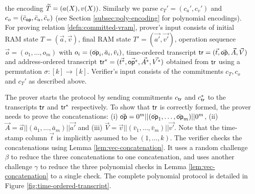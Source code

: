 the encoding $\widetilde{T}=(a(X), v(X))$. Similarly we parse $c_T'=(c_a', c_v')$ and $c_o=(\bar{c}_{\mathsf{op}}, \bar{c}_a, \bar{c}_v)$ (see Section
\ref{subsec:poly-encoding} for polynomial encodings).
For proving relation \ref{defn:committed-vram}, prover's input consists of initial RAM state $T=(\vec{a},\vec{v})$,
final RAM state $T'=(\vec{a'},\vec{v'})$, operation sequence $\vec{o}=(o_1,\ldots,o_m)$ with $o_i=(\bar{\mathsf{op}}_i,\bar{a}_i,\bar{v}_i)$,
time-ordered transcript $\mathsf{tr}=(\vec{t},\vec{\mathsf{op}},\vec{A},\vec{V})$ and address-ordered transcript $\mathsf{tr}^\ast=(\vec{t^\ast},\vec{\mathsf{op}^\ast},
\vec{A^\ast},\vec{V^\ast})$ obtained from $\mathsf{tr}$ using a permutation $\sigma:[k]\rightarrow [k]$. Verifier's input consists of the
commitments $c_T, c_o$ and $c_T'$ as described above.

The prover starts the protocol by sending commitments $c_{\mathsf{tr}}$ and $c^\ast_{\mathsf{tr}}$ to the transcripts $\mathsf{tr}$ and $\mathsf{tr}^\ast$ respectively.
To show that $\mathsf{tr}$ is correctly formed, the prover needs to prove the concatenations:
(i) $\vec{\mathsf{op}}=0^m||(\bar{\mathsf{op}}_1,\ldots,\bar{\mathsf{op}}_m)||0^m$, (ii) $\vec{A}=\vec{a}||(\bar{a}_1,\ldots,\bar{a}_m)||\vec{a'}$
and (iii) $\vec{V}=\vec{v}||(\bar{v}_1,\ldots,\bar{v}_m)||\vec{v'}$. Note that the time-stamp column $\vec{t}$ is implicitly assumed
to be $(1,\ldots,k)$.
The verifier checks the concatenations using Lemma \ref{lem:vec-concatenation}.
It uses a random challenge $\beta$ to reduce the three concatenations to one concatenation, and uses another challenge $\gamma$
to reduce the three polynomial checks in Lemma \ref{lem:vec-concatenation} to a single check.
The complete polynomial protocol is detailed in Figure \ref{fig:time-ordered-transcript}.

